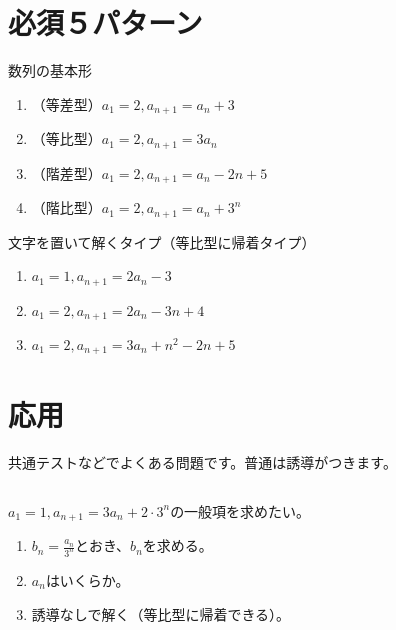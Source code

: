 \documentclass[12pt,a4paper]{jsarticle}
\begin{document}
\section{必須５パターン}
数列の基本形
\begin{enumerate}
    \item （等差型）$a_1=2, a_{n+1}=a_n +3$
    \item （等比型）$a_1=2, a_{n+1}=3 a_n$
    \item （階差型）$a_1=2, a_{n+1}=a_n -2n+5$
    \item （階比型）$a_1=2, a_{n+1}=a_n +3^n$
\end{enumerate}
文字を置いて解くタイプ（等比型に帰着タイプ）
\begin{enumerate}
    \item $a_1=1, a_{n+1}=2 a_n -3$
    \item $a_1=2, a_{n+1}=2 a_n -3n+4$
    \item $a_1=2, a_{n+1}=3a_n+n^2 -2n +5$
\end{enumerate}
\section{応用}
共通テストなどでよくある問題です。普通は誘導がつきます。
\subsection{}
$a_1=1,a_{n+1}=3a_{n}+2\cdot 3^n$の一般項を求めたい。
\begin{enumerate}
    \item $b_n=\frac{a_n}{3^n}$とおき、$b_n$を求める。
    \item $a_n$はいくらか。
    \item 誘導なしで解く（等比型に帰着できる）。
\end{enumerate}
\end{document}
